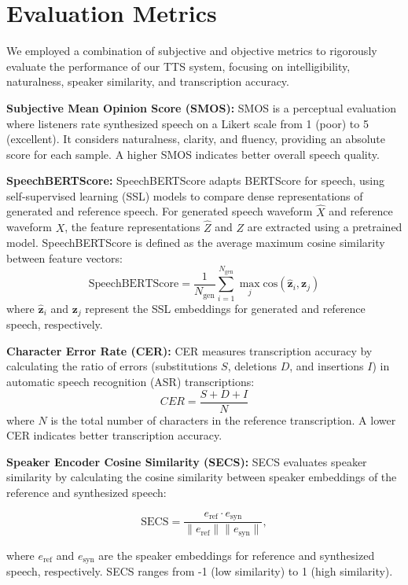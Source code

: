 \section{Evaluation Metrics}
\label{app:eval_metrics}
We employed a combination of subjective and objective metrics to rigorously evaluate the performance of our TTS system, focusing on intelligibility, naturalness, speaker similarity, and transcription accuracy.

\noindent \textbf{Subjective Mean Opinion Score (SMOS):} SMOS is a perceptual evaluation where listeners rate synthesized speech on a Likert scale from 1 (poor) to 5 (excellent). It considers naturalness, clarity, and fluency, providing an absolute score for each sample. A higher SMOS indicates better overall speech quality.

\noindent \textbf{SpeechBERTScore:} SpeechBERTScore adapts BERTScore for speech, using self-supervised learning (SSL) models to compare dense representations of generated and reference speech. For generated speech waveform $\hat{X}$ and reference waveform $X$, the feature representations $\hat{Z}$ and $Z$ are extracted using a pretrained model. SpeechBERTScore is defined as the average maximum cosine similarity between feature vectors:
\[
\text{SpeechBERTScore} = \frac{1}{N_{\text{gen}}} \sum_{i=1}^{N_{\text{gen}}} \max_{j} \text{cos}(\hat{\mathbf{z}}_i, \mathbf{z}_j)
\]
where $\hat{\mathbf{z}}_i$ and $\mathbf{z}_j$ represent the SSL embeddings for generated and reference speech, respectively.

\noindent \textbf{Character Error Rate (CER):} CER measures transcription accuracy by calculating the ratio of errors (substitutions $S$, deletions $D$, and insertions $I$) in automatic speech recognition (ASR) transcriptions:
\[
CER = \frac{S + D + I}{N}
\]
where $N$ is the total number of characters in the reference transcription. A lower CER indicates better transcription accuracy.

\noindent \textbf{Speaker Encoder Cosine Similarity (SECS):} SECS evaluates speaker similarity by calculating the cosine similarity between speaker embeddings of the reference and synthesized speech:

\[
\text{SECS} = \frac{e_{\text{ref}} \cdot e_{\text{syn}}}{\|e_{\text{ref}}\| \|e_{\text{syn}}\|},
\]

where $e_{\text{ref}}$ and $e_{\text{syn}}$ are the speaker embeddings for reference and synthesized speech, respectively. SECS ranges from -1 (low similarity) to 1 (high similarity).

